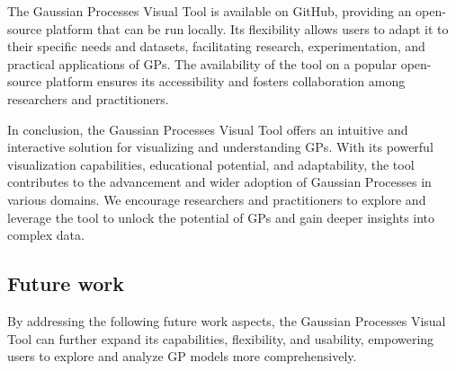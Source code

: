 \documentclass[preprint,journal]{vgtc}       %
\begin{document}
The Gaussian Processes Visual Tool is available on GitHub, providing an open-source platform that can be run locally. Its flexibility allows users to adapt it to their specific needs and datasets, facilitating research, experimentation, and practical applications of GPs. The availability of the tool on a popular open-source platform ensures its accessibility and fosters collaboration among researchers and practitioners.

In conclusion, the Gaussian Processes Visual Tool offers an intuitive and interactive solution for visualizing and understanding GPs. With its powerful visualization capabilities, educational potential, and adaptability, the tool contributes to the advancement and wider adoption of Gaussian Processes in various domains. We encourage researchers and practitioners to explore and leverage the tool to unlock the potential of GPs and gain deeper insights into complex data.


\subsection{Future work}

By addressing the following future work aspects, the Gaussian Processes Visual Tool can further expand its capabilities, flexibility, and usability, empowering users to explore and analyze GP models more comprehensively.
\end{document}
